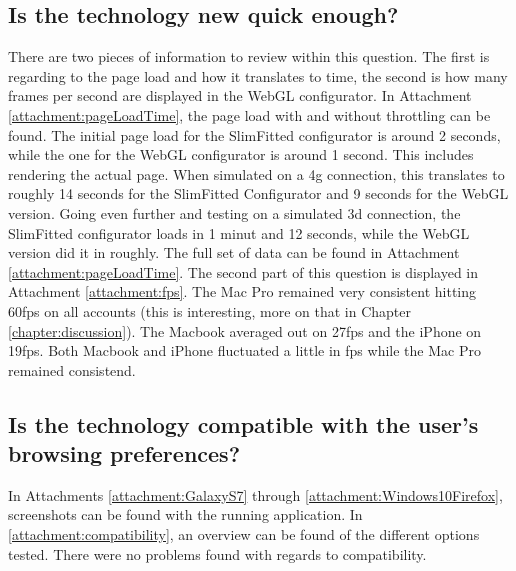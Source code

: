 \subsection {Is the technology new quick enough?}
There are two pieces of information to review within this question. The first is regarding to the page load and how it translates to time, the second is how many frames per second are displayed in the WebGL configurator. In Attachment \ref{attachment:pageLoadTime}, the page load with and without throttling can be found. The initial page load for the SlimFitted configurator is around 2 seconds, while the one for the WebGL configurator is around 1 second. This includes rendering the actual page. When simulated on a 4g connection, this translates to roughly 14 seconds for the SlimFitted Configurator and 9 seconds for the WebGL version. Going even further and testing on a simulated 3d connection, the SlimFitted configurator loads in 1 minut and 12 seconds, while the WebGL version did it in roughly. The full set of data can be found in Attachment \ref{attachment:pageLoadTime}. \newline
The second part of this question is displayed in Attachment \ref{attachment:fps}. The Mac Pro remained very consistent hitting 60fps on all accounts (this is interesting, more on that in Chapter \ref{chapter:discussion}). The Macbook averaged out on 27fps and the iPhone on 19fps. Both Macbook and iPhone fluctuated a little in fps while the Mac Pro remained consistend.

\subsection {Is the technology compatible with the user's browsing preferences?}
In Attachments \ref{attachment:GalaxyS7} through \ref{attachment:Windows10Firefox}, screenshots can be found with the running application. In \ref{attachment:compatibility}, an overview can be found of the different options tested. There were no problems found with regards to compatibility.


